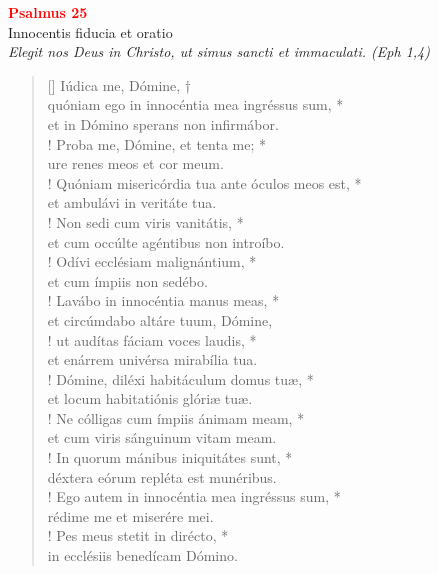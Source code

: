 


\def\greinitialformat#1{%
{\fontsize{39}{39}\selectfont #1}%
}




\vspace{0.3cm}
\begin{center}
 \textcolor{red}{\large \bf Psalmus 25}\\
Innocentis fiducia et oratio\\
\textit{\small Elegit nos Deus in Christo, ut simus sancti et immaculati. (Eph 1,4)}
\end{center}
\begin{verse}[\versewidth]
Iúdica me, Dómine, †\\
quóniam ego in innocéntia mea ingréssus sum, *\\
et in Dómino sperans non infirmábor.\\!
\vin Proba me, Dómine, et tenta me; *\\
\vin ure renes meos et cor meum.\\!
Quóniam misericórdia tua ante óculos meos est, *\\
et ambulávi in veritáte tua.\\!
\vin Non sedi cum viris vanitátis, *\\
\vin et cum occúlte agéntibus non introíbo.\\!
Odívi ecclésiam malignántium, *\\
et cum ímpiis non sedébo.\\!
\vin Lavábo in innocéntia manus meas, *\\
\vin et circúmdabo altáre tuum, Dómine,\\!
ut audítas fáciam voces laudis, *\\
et enárrem univérsa mirabília tua.\\!
\vin Dómine, diléxi habitáculum domus tuæ, *\\
\vin et locum habitatiónis glóriæ tuæ.\\!
Ne cólligas cum ímpiis ánimam meam, *\\
et cum viris sánguinum vitam meam.\\!
\vin In quorum mánibus iniquitátes sunt, *\\
\vin déxtera eórum repléta est munéribus.\\!
Ego autem in innocéntia mea ingréssus sum, *\\
rédime me et miserére mei.\\!
\vin Pes meus stetit in dirécto, *\\
\vin in ecclésiis benedícam Dómino.\\
\end{verse}
\vspace{1cm}


